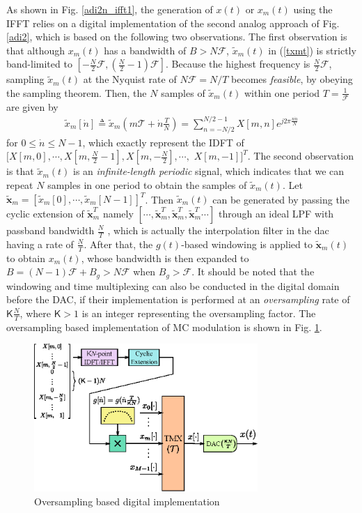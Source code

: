 \documentclass[journal]{IEEEtran}
\begin{document}
As shown in Fig. \ref{adi2n_ifft1}, the generation of $x(t)$ or $x_m(t)$ using the IFFT relies on a digital implementation of the second analog approach of Fig. \ref{adi2}, which is based on the following two observations. The first observation is that although $x_m(t)$ has a bandwidth of $B>N\mathcal F$, $\tilde x_m(t)$ in (\ref{txmt}) is strictly band-limited to $[-\frac{N}{2}\mathcal F, (\frac{N}{2}-1)\mathcal F]$. Because the highest frequency is $\frac{N}{2}\mathcal F$, sampling $\tilde x_m(t)$ at the Nyquist rate of $N\mathcal F=N/T$ becomes \emph{feasible}, {by obeying the sampling theorem.} Then, the $N$ samples of $\tilde x_m(t)$ within one period $T=\frac{1}{\mathcal F}$ are given by
\begin{align}
  \tilde x_m[\dot n] \triangleq  \tilde x_m \left(m\mathcal T+\dot n \frac{T}{N}\right) = \sum_{n=-N/2}^{N/2-1}X[m,n]e^{j2\pi \frac{n \dot n}{N}}
\end{align}
for $0\le \dot n \le N-1$, which exactly represent the IDFT of
$[X[m,0],\cdots,X[m,\frac{N}{2}-1],X[m,-\frac{N}{2}],\cdots,$ $X[m,-1]]^T$.
The second observation is that $\tilde x_m(t)$ is an \emph{infinite-length periodic} signal, which indicates that we can repeat $N$ samples in one period to obtain the samples of $\tilde x_m(t)$.
Let $\tilde {\mathbf x}_m= [\tilde x_m[0], \cdots, \tilde x_m[N-1]]^T$. Then $\tilde x_m(t)$ can be generated by passing the cyclic extension of $\tilde {\mathbf x}_m^T$ namely $[\cdots, \tilde {\mathbf x}_m^T, \tilde {\mathbf x}_m^T, \tilde {\mathbf x}_m^T \cdots]$ through an ideal LPF with passband bandwidth $\frac{N}{T}$ \cite{oddmicc22}, which is actually the interpolation filter in the \ac{dac} having a rate of $\frac{N}{T}$. After that, the $g(t)$-based windowing is applied to $\tilde {\mathbf x}_m(t)$ to obtain $x_m(t)$, whose bandwidth is then expanded to
$B=(N-1)\mathcal F+B_g>N\mathcal F$ when $B_g>\mathcal F$. It should be noted that the windowing and time multiplexing can also be conducted in the digital domain before the DAC, if their implementation is performed at an \emph{oversampling} rate of $\mathsf K \frac{N}{T}$, where $\mathsf K>1$ is an integer representing the oversampling factor. The oversampling based implementation of MC modulation is shown in Fig. \ref{adi2n_ifft2}.

\begin{figure}[t]
  \centering
  \includegraphics[width=8.5cm]{adi2n_ifft2}
  \caption{Oversampling based digital implementation}
  \label{adi2n_ifft2}
\end{figure}
\end{document}
